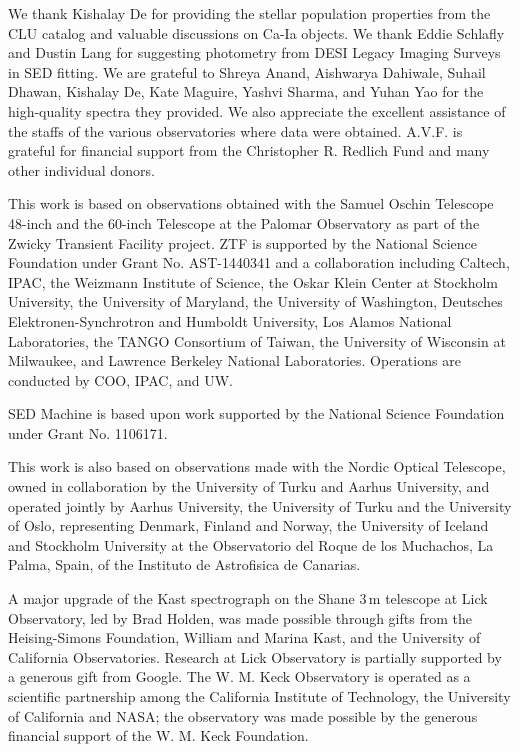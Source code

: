 \documentclass[twocolumn]{aastex631}
\begin{document}
\begin{acknowledgements}
We thank Kishalay De for providing the stellar population properties from the CLU catalog and valuable discussions on Ca-Ia objects. We thank Eddie Schlafly and Dustin Lang for suggesting photometry from DESI Legacy Imaging Surveys in SED fitting. We are grateful to Shreya Anand, Aishwarya Dahiwale, Suhail Dhawan, Kishalay De, Kate Maguire, Yashvi Sharma, and Yuhan Yao for the high-quality spectra they provided. We also appreciate the excellent assistance of the staffs of the various observatories where data were obtained. A.V.F. is grateful for financial support from the Christopher R. Redlich Fund and many other individual donors.

This work is based on observations obtained with the Samuel Oschin Telescope 48-inch and the 60-inch Telescope at the Palomar Observatory as part of the Zwicky Transient Facility project. ZTF is supported by the National Science Foundation under Grant No. AST-1440341 and a collaboration including Caltech, IPAC, the Weizmann Institute of Science, the Oskar Klein Center at Stockholm University, the University of Maryland, the University of Washington, Deutsches Elektronen-Synchrotron and Humboldt University, Los Alamos National Laboratories, the TANGO Consortium of Taiwan, the University of Wisconsin at Milwaukee, and Lawrence Berkeley National Laboratories. Operations are conducted by COO, IPAC, and UW. 

SED Machine is based upon work supported by the National Science Foundation under Grant No. 1106171.

This work is also based on observations made with the Nordic Optical Telescope, owned in collaboration by the University of Turku and Aarhus University, and operated jointly by Aarhus University, the University of Turku and the University of Oslo, representing Denmark, Finland and Norway, the University of Iceland and Stockholm University at the Observatorio del Roque de los Muchachos, La Palma, Spain, of the Instituto de Astrofisica de Canarias.

A major upgrade of the Kast spectrograph on the Shane 3\,m telescope at Lick Observatory, led by Brad Holden, was made possible through gifts from the Heising-Simons Foundation, William and Marina Kast, and the University of California Observatories. Research at Lick Observatory is partially supported by a generous gift from Google. The W. M. Keck Observatory is operated as a scientific partnership among the California Institute of Technology, the University of California and NASA; the observatory was made possible by the generous financial support of the W. M. Keck Foundation.

\end{acknowledgements}
\end{document}
